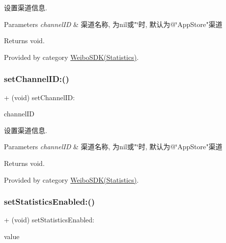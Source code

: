设置渠道信息. 
\begin{DoxyParams}{Parameters}
{\em channel\+ID} & 渠道名称, 为nil或"\char`\"{}时, 默认为@\char`\"{}App\+Store"渠道 \\
\hline
\end{DoxyParams}
\begin{DoxyReturn}{Returns}
void. 
\end{DoxyReturn}


Provided by category \mbox{\hyperlink{category_weibo_s_d_k_07_statistics_08_a8d9fad53942642ec304ecba4734e05c1}{Weibo\+S\+D\+K(\+Statistics)}}.

\mbox{\label{interface_weibo_s_d_k_a8d9fad53942642ec304ecba4734e05c1}} 
\subsubsection{\texorpdfstring{set\+Channel\+I\+D\+:()}{setChannelID:()}\hspace{0.1cm}{\footnotesize\ttfamily [3/3]}}
{\footnotesize\ttfamily + (void) set\+Channel\+I\+D\+: \begin{DoxyParamCaption}\item[{(N\+S\+String $\ast$)}]{channel\+ID }\end{DoxyParamCaption}}

设置渠道信息. 
\begin{DoxyParams}{Parameters}
{\em channel\+ID} & 渠道名称, 为nil或"\char`\"{}时, 默认为@\char`\"{}App\+Store"渠道 \\
\hline
\end{DoxyParams}
\begin{DoxyReturn}{Returns}
void. 
\end{DoxyReturn}


Provided by category \mbox{\hyperlink{category_weibo_s_d_k_07_statistics_08_a8d9fad53942642ec304ecba4734e05c1}{Weibo\+S\+D\+K(\+Statistics)}}.

\mbox{\label{interface_weibo_s_d_k_a0b32ee3e2b30059b93e7dea204b43818}} 
\subsubsection{\texorpdfstring{set\+Statistics\+Enabled\+:()}{setStatisticsEnabled:()}\hspace{0.1cm}{\footnotesize\ttfamily [1/3]}}
{\footnotesize\ttfamily + (void) set\+Statistics\+Enabled\+: \begin{DoxyParamCaption}\item[{(B\+O\+OL)}]{value }\end{DoxyParamCaption}}

